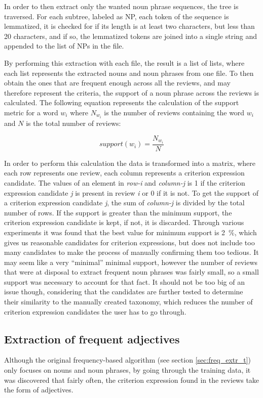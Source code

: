 In order to then extract only the wanted noun phrase sequences, the tree is traversed. For each subtree, labeled as NP,  each token of the sequence is lemmatized, it is checked for if its length is at least two characters, but less than 20 characters, and if so, the lemmatized tokens are joined into a single string and appended to the list of NPs in the file.

By performing this extraction with each file, the result is a list of lists, where each list represents the extracted nouns and noun phrases from one file. To then obtain the ones that are frequent enough across all the reviews, and may therefore represent the criteria, the support of a noun phrase across the reviews is calculated. The following equation represents the calculation of the support metric for a word $w_{i}$ where $N_{w_{i}}$ is the number of reviews containing the word $w_{i}$ and $N$ is the total number of reviews:

\begin{equation}
support(w_{i})=\frac{N_{w_{i}}}{N}
\end{equation}

In order to perform this calculation the data is transformed into a matrix, where each row represents one review, each column represents a criterion expression candidate. The values of an element in \textit{row-i} and \textit{column-j} is 1 if the criterion expression candidate \textit{j} is present in review \textit{i} or 0 if it is not. To get the support of a criterion expression candidate \textit{j}, the sum of \textit{column-j} is divided by the total number of rows. If the support is greater than the minimum support, the criterion expression candidate is kept, if not, it is discarded. Through various experiments it was found that the best value for minimum support is 2~\%, which gives us reasonable candidates for criterion expressions, but does not include too many candidates to make the process of manually confirming them too tedious. It may seem like a very ``minimal'' minimal support, however the number of reviews that were at disposal to extract frequent noun phrases was fairly small, so a small support was necessary to account for that fact. It should not be too big of an issue though, considering that the candidates are further tested to determine their similarity to the manually created taxonomy, which reduces the number of criterion expression candidates the user has to go through.

\subsection{Extraction of frequent adjectives}
Although the original frequency-based algorithm (see section \ref{sec:freq_extr_t}) only focuses on nouns and noun phrases, by going through the training data, it was discovered that fairly often, the criterion expression found in the reviews take the form of adjectives. 

